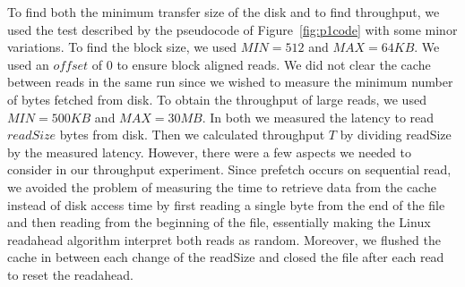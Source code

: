 To find both the minimum transfer size of the disk and to find throughput, we used 
the test described by the pseudocode of Figure~\ref{fig:p1code} with some minor 
variations. To find the block size, we used $MIN = 512$ and $MAX = 64KB $. 
We used an $offset$ of 0 to ensure block aligned reads. We did not clear the cache
between reads in the same run since we wished to measure the minimum number of bytes
fetched from disk. To obtain the throughput of large reads, we used $MIN = 500KB$ and
$MAX = 30MB$. In both we measured the latency to read $readSize$ bytes from disk.
Then we calculated throughput $T$ by dividing readSize by the measured latency. 
However, there were a few aspects we needed to consider in our throughput experiment. 
Since prefetch occurs on sequential read, we avoided the problem of measuring the 
time to retrieve data from the cache instead of disk access time by first reading 
a single byte from the end of the file and then reading from the beginning of the file, 
essentially making the Linux readahead algorithm interpret both reads as random. 
Moreover, we flushed the cache in between each change of the readSize and closed
the file after each read to reset the readahead.


